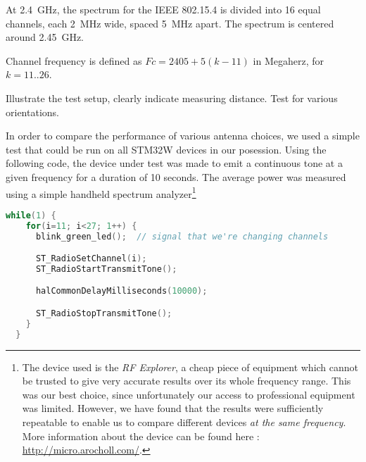 At \SI{2.4}{GHz}, the spectrum for the IEEE 802.15.4 is divided into 16 equal
channels, each \SI{2}{MHz} wide, spaced \SI{5}{MHz} apart. The spectrum is
centered around \SI{2.45}{GHz}.\citep[pg. 29]{ieee802154}

Channel frequency is defined as $Fc = 2405 + 5 (k-11)$ in Megaherz, for $k
= 11..26$.

Illustrate the test setup, clearly indicate measuring distance. Test for various
orientations.

In order to compare the performance of various antenna choices, we used a simple
test that could be run on all STM32W devices in our posession. Using the
following code, the device under test was made to emit a continuous tone at
a given frequency for a duration of 10 seconds. The average power was measured
using a simple handheld spectrum analyzer\footnote{The device used is the
\emph{RF Explorer}, a cheap piece of equipment which cannot be trusted to give
very accurate results over its whole frequency range. This was our best choice,
since unfortunately our access to professional equipment was limited. However,
we have found that the results were sufficiently repeatable to enable us to
compare different devices \emph{at the same frequency}. More information about
the device can be found here : \url{http://micro.arocholl.com/}.}

\begin{lstlisting}[language=C,caption=Tone generation code]
  while(1) {
    for(i=11; i<27; 1++) {
      blink_green_led();  // signal that we're changing channels

      ST_RadioSetChannel(i);
      ST_RadioStartTransmitTone();

      halCommonDelayMilliseconds(10000);

      ST_RadioStopTransmitTone();
    }
  }
\end{lstlisting}

